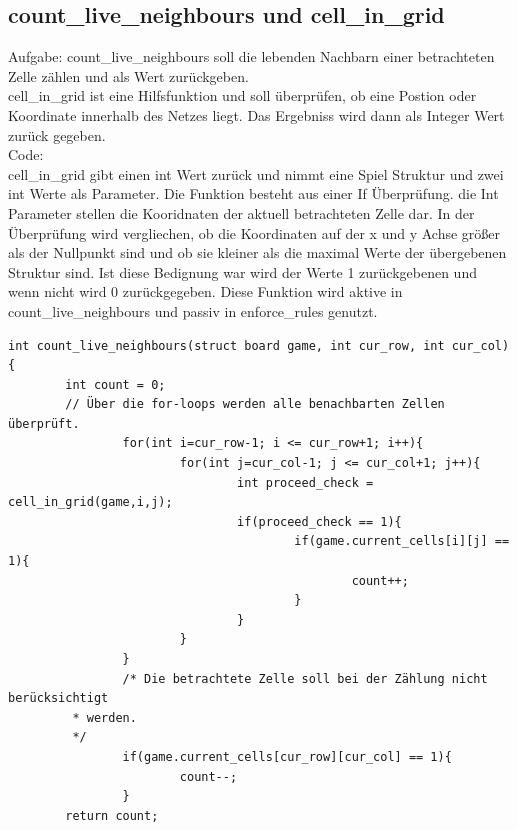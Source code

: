 \documentclass[11pt]{scrartcl}
\begin{document}
\subsection{count\_live\_neighbours und cell\_in\_grid}
Aufgabe: count\_live\_neighbours soll die lebenden Nachbarn einer betrachteten Zelle zählen und als Wert zurückgeben.\\
cell\_in\_grid ist eine Hilfsfunktion und soll überprüfen, ob eine Postion oder Koordinate innerhalb des Netzes liegt. Das Ergebniss wird dann als Integer Wert zurück gegeben.\\
Code:\\
cell\_in\_grid gibt einen int Wert zurück und nimmt eine Spiel Struktur und zwei int Werte als Parameter. Die Funktion besteht aus einer If Überprüfung. die Int Parameter stellen die Kooridnaten der aktuell betrachteten Zelle dar.
In der Überprüfung wird vergliechen, ob die Koordinaten auf der x\- und y\- Achse grö\ss er als der Nullpunkt sind und ob sie kleiner als die maximal Werte der übergebenen Struktur sind. Ist diese Bedignung war wird der Werte 1 zurückgebenen und wenn nicht wird 0 zurückgegeben. Diese Funktion wird aktive in count\_live\_neighbours und passiv in enforce\_rules genutzt.\\
\begin{verbatim}
int count_live_neighbours(struct board game, int cur_row, int cur_col){
        int count = 0;
		// Über die for-loops werden alle benachbarten Zellen überprüft.
                for(int i=cur_row-1; i <= cur_row+1; i++){
                        for(int j=cur_col-1; j <= cur_col+1; j++){
                                int proceed_check = cell_in_grid(game,i,j);
                                if(proceed_check == 1){
                                        if(game.current_cells[i][j] == 1){
                                                count++;
                                        }
                                }
                        }
                }
                /* Die betrachtete Zelle soll bei der Zählung nicht berücksichtigt
		 * werden.
		 */
                if(game.current_cells[cur_row][cur_col] == 1){
                        count--;
                }
        return count;
\end{verbatim}
\end{document}
